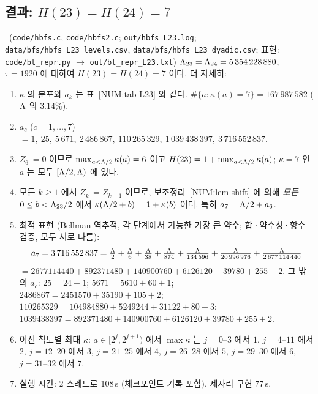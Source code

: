 \subsection{결과: $H(23)=H(24)=7$}\label{NUM:ssec-H23}

\begin{theorem}[수치 결과]\label{NUM:thm-H23}
\NUMERIC\ (\texttt{code/hbfs.c}, \texttt{code/hbfs2.c}; \texttt{out/hbfs\_L23.log};
\texttt{data/bfs/hbfs\_L23\_levels.csv}, \texttt{data/bfs/hbfs\_L23\_dyadic.csv};
표현: \texttt{code/bt\_repr.py} $\to$ \texttt{out/bt\_repr\_L23.txt})
$\Lambda_{23}=\Lambda_{24}=5\,354\,228\,880$, $\tau=1920$ 에 대하여 $H(23)=H(24)=7$ 이다. 더 자세히:
\begin{enumerate}[label=(\arabic*)]
\item $\kappa$ 의 분포와 $a_k$ 는 표~\ref{NUM:tab-L23} 와 같다. $\#\{a:\kappa(a)=7\}=167\,987\,582$ ($\Lambda$ 의 $3.14\%$).
\item $a_c$ ($c=1,\dots,7$) $=1,\ 25,\ 5\,671,\ 2\,486\,867,\ 110\,265\,329,\ 1\,039\,438\,397,\ 3\,716\,552\,837$.
\item $Z^-_6=0$ 이므로 $\max_{a<\Lambda/2}\kappa(a)=6$ 이고 $H(23)=1+\max_{a<\Lambda/2}\kappa(a)$; $\kappa=7$ 인 $a$ 는 모두 $[\Lambda/2,\Lambda)$ 에 있다.
\item 모든 $k\ge1$ 에서 $Z^+_k=Z^-_{k-1}$ 이므로, 보조정리~\ref{NUM:lem-shift} 에 의해
\emph{모든} $0\le b<\Lambda_{23}/2$ 에서 $\kappa(\Lambda/2+b)=1+\kappa(b)$ 이다. 특히 $a_7=\Lambda/2+a_6$.
\item 최적 표현 (Bellman 역추적, 각 단계에서 가능한 가장 큰 약수; 합·약수성·항수 검증, 모두 서로 다름):
\[
a_7=3\,716\,552\,837=\tfrac{\Lambda}{2}+\tfrac{\Lambda}{6}+\tfrac{\Lambda}{38}+\tfrac{\Lambda}{874}+\tfrac{\Lambda}{134\,596}+\tfrac{\Lambda}{20\,996\,976}+\tfrac{\Lambda}{2\,677\,114\,440}
\]
$=2677114440+892371480+140900760+6126120+39780+255+2$.
그 밖의 $a_c$: $25=24+1$; $5671=5610+60+1$; $2486867=2451570+35190+105+2$;
$110265329=104984880+5249244+31122+80+3$; $1039438397=892371480+140900760+6126120+39780+255+2$.
\item 이진 척도별 최대 $\kappa$: $a\in[2^j,2^{j+1})$ 에서 $\max\kappa$ 는
$j=0$--$3$ 에서 $1$, $j=4$--$11$ 에서 $2$, $j=12$--$20$ 에서 $3$, $j=21$--$25$ 에서 $4$, $j=26$--$28$ 에서 $5$, $j=29$--$30$ 에서 $6$, $j=31$--$32$ 에서 $7$.
\item 실행 시간: 2 스레드로 108\,s (체크포인트 기록 포함), 제자리 구현 77\,s.
\end{enumerate}
\end{theorem}

